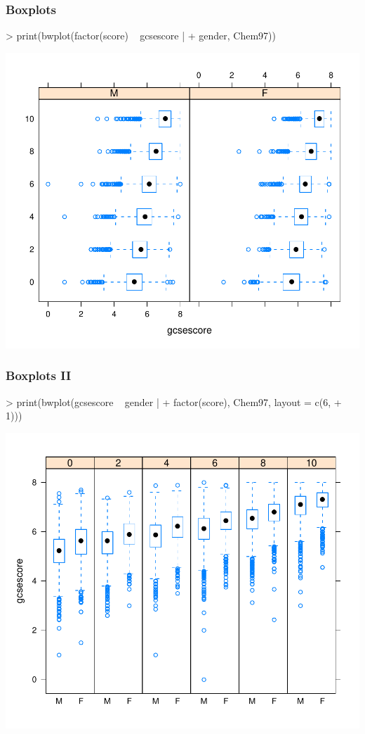 \begin{frame}
  \frametitle{Boxplots}
\begin{Schunk}
\begin{Sinput}
> print(bwplot(factor(score) ~ gcsescore | 
+     gender, Chem97))
\end{Sinput}
\end{Schunk}
\includegraphics{plots/fig-016}
\end{frame}

\begin{frame}
  \frametitle{Boxplots II}
\begin{Schunk}
\begin{Sinput}
> print(bwplot(gcsescore ~ gender | 
+     factor(score), Chem97, layout = c(6, 
+     1)))
\end{Sinput}
\end{Schunk}
\includegraphics{plots/fig-017}
\end{frame}

